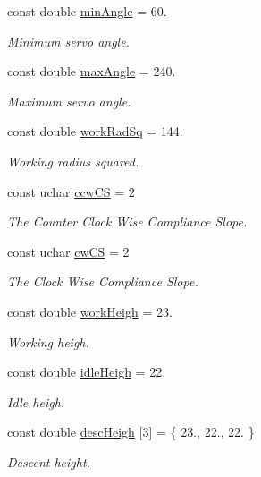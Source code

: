 \begin{DoxyCompactItemize}
const double \hyperlink{a00009_a9af4e0214b1b5c64978bbef49cde6d3c}{min\+Angle} = 60.
\begin{DoxyCompactList}\small\item\em Minimum servo angle. \end{DoxyCompactList}\item 
const double \hyperlink{a00009_a77cc2aed4eff12967e346cb64f6be192}{max\+Angle} = 240.
\begin{DoxyCompactList}\small\item\em Maximum servo angle. \end{DoxyCompactList}\item 
const double \hyperlink{a00009_a4b9e5de00a02c6f77e4308ed209f0cc0}{work\+Rad\+Sq} = 144.
\begin{DoxyCompactList}\small\item\em Working radius squared. \end{DoxyCompactList}\item 
const uchar \hyperlink{a00009_ac2d1087cd0cc45ef71c77aa20b41ceda}{ccw\+C\+S} = 2
\begin{DoxyCompactList}\small\item\em The Counter Clock Wise Compliance Slope. \end{DoxyCompactList}\item 
const uchar \hyperlink{a00009_a67b2528edcaa375aefa1fb4117576665}{cw\+C\+S} = 2
\begin{DoxyCompactList}\small\item\em The Clock Wise Compliance Slope. \end{DoxyCompactList}\item 
const double \hyperlink{a00009_a53758fdbbee450ab4cd5a3432725f056}{work\+Heigh} = 23.
\begin{DoxyCompactList}\small\item\em Working heigh. \end{DoxyCompactList}\item 
const double \hyperlink{a00009_aee236c1b7ec8fb4c35d7930d9393f643}{idle\+Heigh} = 22.
\begin{DoxyCompactList}\small\item\em Idle heigh. \end{DoxyCompactList}\item 
const double \hyperlink{a00009_a9ca211d5d711c959689afd7fff5a897a}{desc\+Heigh} \mbox{[}3\mbox{]} = \{ 23., 22., 22. \}
\begin{DoxyCompactList}\small\item\em Descent height. \end{DoxyCompactList}\item 

\end{DoxyCompactItemize}
